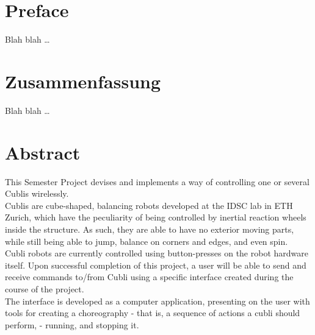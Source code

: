 
\chapter*{Preface}

Blah blah \dots

 \cleardoublepage


 \setcounter{tocdepth}{2}
 \tableofcontents

 \cleardoublepage


\chapter*{Zusammenfassung}

Blah blah \dots


 \cleardoublepage

\chapter*{Abstract}

This Semester Project devises and implements a way of controlling one or several Cublis wirelessly.\\ 

Cublis are cube-shaped, balancing robots developed at the IDSC lab in ETH Zurich, which have the peculiarity of being controlled by inertial reaction wheels inside the structure. As such, they are able to have no exterior moving parts, while still being able to jump, balance on corners and edges, and even spin.\\ 

Cubli robots are currently controlled using button-presses on the robot hardware itself. Upon successful completion of this project, a user will be able to send and receive commands to/from Cubli using a specific interface created during the course of the project.\\

The interface is developed as a computer application, presenting on the user with tools for creating a choreography - that is, a sequence of actions a cubli should perform, - running, and stopping it.\\ 

